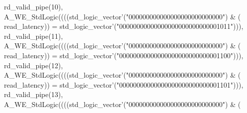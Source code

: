 \begin{DoxyCode}
{      rd_valid_pipe}\textcolor{vhdlchar}{(}\textcolor{vhdllogic}{}\textcolor{vhdllogic}{10}\textcolor{vhdlchar}{)}\textcolor{vhdlchar}{,} \textcolor{vhdlchar}{A\_WE\_StdLogic}\textcolor{vhdlchar}{(}\textcolor{vhdlchar}{(}\textcolor{vhdlchar}{(}\textcolor{vhdlchar}{(}\textcolor{comment}{std\_logic\_vector}\textcolor{vhdlchar}{'}\textcolor{vhdlchar}{(}\textcolor{vhdllogic}{"000000000000000000000000000"}\textcolor{vhdlchar}{)} \textcolor{vhdlchar}{&} \textcolor{vhdlchar}{(}\textcolor{vhdlchar}{
      read_latency}\textcolor{vhdlchar}{)}\textcolor{vhdlchar}{)} \textcolor{vhdlchar}{=} \textcolor{comment}{std\_logic\_vector}\textcolor{vhdlchar}{'}\textcolor{vhdlchar}{(}\textcolor{vhdllogic}{"00000000000000000000000000001011"}\textcolor{vhdlchar}{)}\textcolor{vhdlchar}{)}\textcolor{vhdlchar}{)}\textcolor{vhdlchar}{,} \textcolor{vhdlchar}{
      rd_valid_pipe}\textcolor{vhdlchar}{(}\textcolor{vhdllogic}{}\textcolor{vhdllogic}{11}\textcolor{vhdlchar}{)}\textcolor{vhdlchar}{,} \textcolor{vhdlchar}{A\_WE\_StdLogic}\textcolor{vhdlchar}{(}\textcolor{vhdlchar}{(}\textcolor{vhdlchar}{(}\textcolor{vhdlchar}{(}\textcolor{comment}{std\_logic\_vector}\textcolor{vhdlchar}{'}\textcolor{vhdlchar}{(}\textcolor{vhdllogic}{"000000000000000000000000000"}\textcolor{vhdlchar}{)} \textcolor{vhdlchar}{&} \textcolor{vhdlchar}{(}\textcolor{vhdlchar}{
      read_latency}\textcolor{vhdlchar}{)}\textcolor{vhdlchar}{)} \textcolor{vhdlchar}{=} \textcolor{comment}{std\_logic\_vector}\textcolor{vhdlchar}{'}\textcolor{vhdlchar}{(}\textcolor{vhdllogic}{"00000000000000000000000000001100"}\textcolor{vhdlchar}{)}\textcolor{vhdlchar}{)}\textcolor{vhdlchar}{)}\textcolor{vhdlchar}{,} \textcolor{vhdlchar}{
      rd_valid_pipe}\textcolor{vhdlchar}{(}\textcolor{vhdllogic}{}\textcolor{vhdllogic}{12}\textcolor{vhdlchar}{)}\textcolor{vhdlchar}{,} \textcolor{vhdlchar}{A\_WE\_StdLogic}\textcolor{vhdlchar}{(}\textcolor{vhdlchar}{(}\textcolor{vhdlchar}{(}\textcolor{vhdlchar}{(}\textcolor{comment}{std\_logic\_vector}\textcolor{vhdlchar}{'}\textcolor{vhdlchar}{(}\textcolor{vhdllogic}{"000000000000000000000000000"}\textcolor{vhdlchar}{)} \textcolor{vhdlchar}{&} \textcolor{vhdlchar}{(}\textcolor{vhdlchar}{
      read_latency}\textcolor{vhdlchar}{)}\textcolor{vhdlchar}{)} \textcolor{vhdlchar}{=} \textcolor{comment}{std\_logic\_vector}\textcolor{vhdlchar}{'}\textcolor{vhdlchar}{(}\textcolor{vhdllogic}{"00000000000000000000000000001101"}\textcolor{vhdlchar}{)}\textcolor{vhdlchar}{)}\textcolor{vhdlchar}{)}\textcolor{vhdlchar}{,} \textcolor{vhdlchar}{
      rd_valid_pipe}\textcolor{vhdlchar}{(}\textcolor{vhdllogic}{}\textcolor{vhdllogic}{13}\textcolor{vhdlchar}{)}\textcolor{vhdlchar}{,} \textcolor{vhdlchar}{A\_WE\_StdLogic}\textcolor{vhdlchar}{(}\textcolor{vhdlchar}{(}\textcolor{vhdlchar}{(}\textcolor{vhdlchar}{(}\textcolor{comment}{std\_logic\_vector}\textcolor{vhdlchar}{'}\textcolor{vhdlchar}{(}\textcolor{vhdllogic}{"000000000000000000000000000"}\textcolor{vhdlchar}{)} \textcolor{vhdlchar}{&} \textcolor{vhdlchar}{(}\textcolor{vhdlchar}{
}
\end{DoxyCode}
